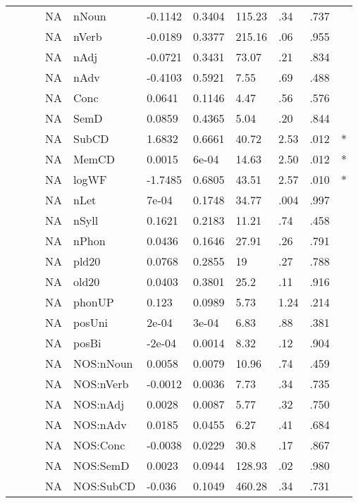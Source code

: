\begin{table}[ht]
\begin{tabular}{lllllllllll}
   &  &  & NA & nNoun & -0.1142 & 0.3404 & 115.23 & .34 & .737 &   \\ 
   &  &  & NA & nVerb & -0.0189 & 0.3377 & 215.16 & .06 & .955 &   \\ 
   &  &  & NA & nAdj & -0.0721 & 0.3431 & 73.07 & .21 & .834 &   \\ 
   &  &  & NA & nAdv & -0.4103 & 0.5921 & 7.55 & .69 & .488 &   \\ 
   &  &  & NA & Conc & 0.0641 & 0.1146 & 4.47 & .56 & .576 &   \\ 
   &  &  & NA & SemD & 0.0859 & 0.4365 & 5.04 & .20 & .844 &   \\ 
   &  &  & NA & SubCD & 1.6832 & 0.6661 & 40.72 & 2.53 & .012 & * \\ 
   &  &  & NA & MemCD & 0.0015 & 6e-04 & 14.63 & 2.50 & .012 & * \\ 
   &  &  & NA & logWF & -1.7485 & 0.6805 & 43.51 & 2.57 & .010 & * \\ 
   &  &  & NA & nLet & 7e-04 & 0.1748 & 34.77 & .004 & .997 &   \\ 
   &  &  & NA & nSyll & 0.1621 & 0.2183 & 11.21 & .74 & .458 &   \\ 
   &  &  & NA & nPhon & 0.0436 & 0.1646 & 27.91 & .26 & .791 &   \\ 
   &  &  & NA & pld20 & 0.0768 & 0.2855 & 19 & .27 & .788 &   \\ 
   &  &  & NA & old20 & 0.0403 & 0.3801 & 25.2 & .11 & .916 &   \\ 
   &  &  & NA & phonUP & 0.123 & 0.0989 & 5.73 & 1.24 & .214 &   \\ 
   &  &  & NA & posUni & 2e-04 & 3e-04 & 6.83 & .88 & .381 &   \\ 
   &  &  & NA & posBi & -2e-04 & 0.0014 & 8.32 & .12 & .904 &   \\ 
   &  &  & NA & NOS:nNoun & 0.0058 & 0.0079 & 10.96 & .74 & .459 &   \\ 
   &  &  & NA & NOS:nVerb & -0.0012 & 0.0036 & 7.73 & .34 & .735 &   \\ 
   &  &  & NA & NOS:nAdj & 0.0028 & 0.0087 & 5.77 & .32 & .750 &   \\ 
   &  &  & NA & NOS:nAdv & 0.0185 & 0.0455 & 6.27 & .41 & .684 &   \\ 
   &  &  & NA & NOS:Conc & -0.0038 & 0.0229 & 30.8 & .17 & .867 &   \\ 
   &  &  & NA & NOS:SemD & 0.0023 & 0.0944 & 128.93 & .02 & .980 &   \\ 
   &  &  & NA & NOS:SubCD & -0.036 & 0.1049 & 460.28 & .34 & .731 &   \\ 

\end{tabular}
\end{table}
